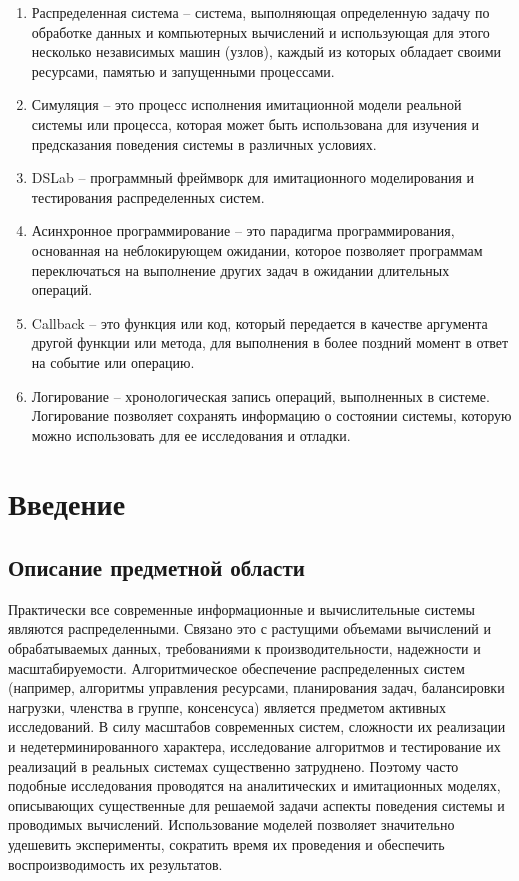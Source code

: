 \begin{enumerate}
    \item Распределенная система -- система, выполняющая определенную задачу по обработке данных и компьютерных вычислений и использующая для этого несколько независимых машин (узлов), каждый из которых обладает своими ресурсами, памятью и запущенными процессами.
    \item Симуляция -- это процесс исполнения имитационной модели реальной системы или процесса, которая может быть использована для изучения и предсказания поведения системы в различных условиях.
    \item DSLab -- программный фреймворк для имитационного моделирования и тестирования распределенных систем.
    \item Асинхронное программирование -- это парадигма программирования, основанная на неблокирующем ожидании, которое позволяет программам переключаться на выполнение других задач в ожидании длительных операций.
    \item Callback -- это функция или код, который передается в качестве аргумента другой функции или метода, для выполнения в более поздний момент в ответ на событие или операцию.
    \item Логирование -- хронологическая запись операций, выполненных в системе. Логирование позволяет сохранять информацию о состоянии системы, которую можно использовать для ее исследования и отладки.
\end{enumerate}

\newpage

\section{Введение}

\subsection{Описание предметной области}

Практически все современные информационные и вычислительные системы являются распределенными. Связано это с растущими объемами вычислений и обрабатываемых данных, требованиями к производительности, надежности и масштабируемости. Алгоритмическое обеспечение распределенных систем (например, алгоритмы управления ресурсами, планирования задач, балансировки нагрузки, членства в группе, консенсуса) является предметом активных исследований. В силу масштабов современных систем, сложности их реализации и недетерминированного характера, исследование алгоритмов и тестирование их реализаций в реальных системах существенно затруднено. Поэтому часто подобные исследования проводятся на аналитических и имитационных моделях, описывающих существенные для решаемой задачи аспекты поведения системы и проводимых вычислений. Использование моделей позволяет значительно удешевить эксперименты, сократить время их проведения и обеспечить воспроизводимость их результатов.

